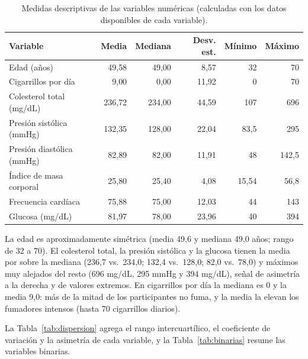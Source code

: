 \documentclass[11pt,a4paper]{article}
\begin{document}
\begin{table}[H]
\centering
\caption{Medidas descriptivas de las variables numéricas (calculadas con los datos disponibles de cada variable).}
\label{tab:descriptivos}
\begin{tabular}{lrrrrr}
\toprule
\textbf{Variable} & \textbf{Media} & \textbf{Mediana} & \textbf{Desv. est.} & \textbf{Mínimo} & \textbf{Máximo} \\
\midrule
Edad (años)                  & 49{,}58  & 49{,}00  & 8{,}57  & 32    & 70  \\
Cigarrillos por día          & 9{,}00   & 0{,}00   & 11{,}92 & 0     & 70  \\
Colesterol total (mg/dL)     & 236{,}72 & 234{,}00 & 44{,}59 & 107   & 696 \\
Presión sistólica (mmHg)     & 132{,}35 & 128{,}00 & 22{,}04 & 83{,}5  & 295 \\
Presión diastólica (mmHg)    & 82{,}89  & 82{,}00  & 11{,}91 & 48    & 142{,}5 \\
Índice de masa corporal      & 25{,}80  & 25{,}40  & 4{,}08  & 15{,}54 & 56{,}8 \\
Frecuencia cardíaca          & 75{,}88  & 75{,}00  & 12{,}03 & 44    & 143 \\
Glucosa (mg/dL)               & 81{,}97  & 78{,}00  & 23{,}96 & 40    & 394 \\
\bottomrule
\end{tabular}
\end{table}

La edad es aproximadamente simétrica (media 49{,}6 y mediana 49{,}0 años; rango de 32 a 70). El
colesterol total, la presión sistólica y la glucosa tienen la media por sobre la mediana (236{,}7 vs.\
234{,}0; 132{,}4 vs.\ 128{,}0; 82{,}0 vs.\ 78{,}0) y máximos muy alejados del resto (696 mg/dL, 295 mmHg y
394 mg/dL), señal de asimetría a la derecha y de valores extremos. En cigarrillos por día la
mediana es 0 y la media 9{,}0: más de la mitad de los participantes no fuma, y la media la elevan
los fumadores intensos (hasta 70 cigarrillos diarios).

La Tabla~\ref{tab:dispersion} agrega el rango intercuartílico, el coeficiente de variación y la asimetría de cada variable, y la Tabla~\ref{tab:binarias} resume las variables binarias.
\end{document}
